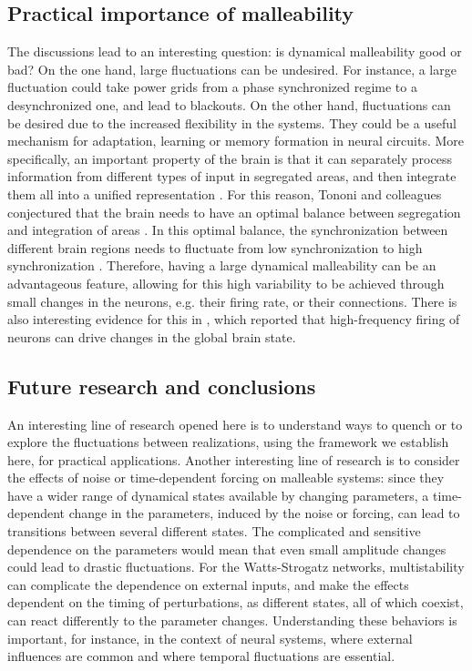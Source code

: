 \subsection*{Practical importance of malleability}
The discussions lead to an interesting question: is dynamical malleability good or bad?  On the one hand, large fluctuations can be undesired. For instance, a large fluctuation could take power grids from a phase synchronized regime to a desynchronized one, and lead to blackouts. On the other hand, fluctuations can be desired due to the increased flexibility in the systems. They could be a useful mechanism for adaptation, learning or memory formation in neural circuits. More specifically, an important property of the brain is that it can separately process information from different types of input in segregated areas, and then integrate them all into a unified representation \cite{tononi1994a, tononi1998consciousness, deco2015rethinking}. For this reason, Tononi and colleagues conjectured that the brain needs to have an optimal balance between segregation and integration of areas \cite{tononi1994a}. In this optimal balance, the synchronization between different brain regions needs to fluctuate from low synchronization to high synchronization \cite{fingelkurts2006timing}. Therefore, having a large dynamical malleability can be an advantageous feature, allowing for this high variability to be achieved through small changes in the neurons, e.g. their firing rate, or their connections. There is also interesting evidence for this in \cite{li2009burst}, which reported that high-frequency firing of neurons can drive changes in the global brain state. 

\subsection*{Future research and conclusions}
An interesting line of research opened here is to understand ways to quench or to explore the fluctuations between realizations, using the framework we establish here, for practical applications. Another interesting line of research is to consider the effects of noise or time-dependent forcing on malleable systems: since they have a wider range of dynamical states available by changing parameters, a time-dependent change in the parameters, induced by the noise or forcing, can lead to transitions between several different states. The complicated and sensitive dependence on the parameters would mean that even small amplitude changes could lead to drastic fluctuations. 
For the Watts-Strogatz networks, multistability can complicate the dependence on external inputs, and make the effects dependent on the timing of perturbations, as different states, all of which coexist, can react differently to the parameter changes. Understanding these behaviors is important, for instance, in the context of neural systems, where external influences are common and where temporal fluctuations are essential.


